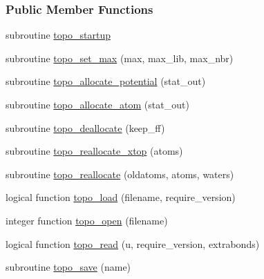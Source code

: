 \subsubsection*{Public Member Functions}
\begin{DoxyCompactItemize}
\item 
subroutine \hyperlink{classtopo_a02f3feddf37e4a6fc41c1d2321db3e02}{topo\-\_\-startup}
\item 
subroutine \hyperlink{classtopo_aa098e159f5c3c082d8dbe514b1312afd}{topo\-\_\-set\-\_\-max} (max, max\-\_\-lib, max\-\_\-nbr)
\item 
subroutine \hyperlink{classtopo_a5d8d6ced35f199f8babf3314deb5bd5b}{topo\-\_\-allocate\-\_\-potential} (stat\-\_\-out)
\item 
subroutine \hyperlink{classtopo_a88a502c82bac0ebb3dbf06b2e7bd0e2b}{topo\-\_\-allocate\-\_\-atom} (stat\-\_\-out)
\item 
subroutine \hyperlink{classtopo_aa6153a7d9918ecb635b405949f7237ee}{topo\-\_\-deallocate} (keep\-\_\-ff)
\item 
subroutine \hyperlink{classtopo_a168e8dd7b1ec88e419b80fa92cadc2c0}{topo\-\_\-reallocate\-\_\-xtop} (atoms)
\item 
subroutine \hyperlink{classtopo_a1ab3b8fc655da30d712a142f00f37491}{topo\-\_\-reallocate} (oldatoms, atoms, waters)
\item 
logical function \hyperlink{classtopo_aac0681f14a49bb07e5cbb3a877b1e5dd}{topo\-\_\-load} (filename, require\-\_\-version)
\item 
integer function \hyperlink{classtopo_a5d064dafa1d8df6166a94664f390767f}{topo\-\_\-open} (filename)
\item 
logical function \hyperlink{classtopo_a7aad640a2ad55b89529425b1f386810a}{topo\-\_\-read} (u, require\-\_\-version, extrabonds)
\item 
subroutine \hyperlink{classtopo_a04787a084f5cd3714804c90837d423d3}{topo\-\_\-save} (name)
\end{DoxyCompactItemize}
